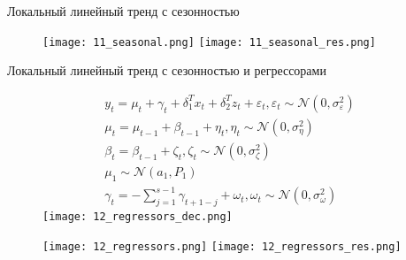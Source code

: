 \documentclass{beamer}
\begin{document}
\begin{frame}[fragile]
\begin{columns}[T]
\begin{column}{.32\textwidth}
\begin{block}{Локальный линейный тренд с сезонностью}
\begin{figure}[htb]
  \texttt{[image: 11\_seasonal.png]}
\endminipage\hfill
{}
  \texttt{[image: 11\_seasonal\_res.png]}
\endminipage\hfill
\end{figure}

\end{block}

\begin{block}{Локальный линейный тренд с сезонностью и регрессорами}

\begin{figure}[htb]
\begin{gather*}
y_t = \mu_t + \gamma_t + \delta_1^T x_t + \delta_2^T z_t + \varepsilon_t, \varepsilon_t \sim \mathcal{N}(0, \sigma^2_\varepsilon)
\\
\mu_t = \mu_{t-1} + \beta_{t-1} + \eta_t, \eta_t \sim \mathcal{N}(0, \sigma^2_\eta)
\\
\beta_t = \beta_{t-1} + \zeta_t, \zeta_t \sim \mathcal{N}(0, \sigma_\zeta^2)
\\
\mu_1 \sim \mathcal{N}(a_1, P_1) 
\\
\gamma_t = - \sum_{j=1}^{s-1} \gamma_{t+1-j} + \omega_t, \omega_t \sim \mathcal{N}(0, \sigma_\omega^2)
\end{gather*}
\endminipage \hfill
{}
\texttt{[image: 12\_regressors\_dec.png]}
\endminipage\hfill
\end{figure}

\begin{figure}[htb]
  \texttt{[image: 12\_regressors.png]}
\endminipage\hfill
{}
  \texttt{[image: 12\_regressors\_res.png]}
\endminipage\hfill
\end{figure}

\end{block}


\end{column}
\end{columns}



\end{frame}
\end{document}
